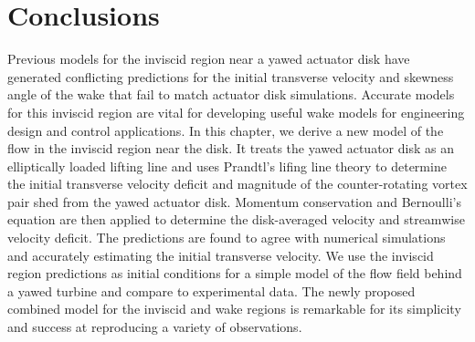 \section{Conclusions}
\label{sec:yaw-conclusions}
Previous models for the inviscid region near a yawed actuator disk have generated conflicting predictions for the initial transverse velocity and skewness angle of the wake that fail to match actuator disk simulations. Accurate models for this inviscid region are vital for developing useful wake models for engineering design and control applications. In this chapter, we derive a new model of the flow in the inviscid region near the disk. It treats the yawed actuator disk as an elliptically loaded lifting line and uses Prandtl's lifing line theory to determine the initial transverse velocity deficit and magnitude of the counter-rotating vortex pair shed from the yawed actuator disk. Momentum conservation and Bernoulli's equation are then applied to determine the disk-averaged velocity and streamwise velocity deficit. The predictions are found to agree with numerical simulations and accurately estimating the initial transverse velocity.  We use the inviscid region predictions as initial conditions for a simple model of the flow field behind a yawed turbine and compare to experimental data. 
The newly proposed combined model for the inviscid and wake regions is remarkable for its simplicity and success at reproducing a variety of observations.

